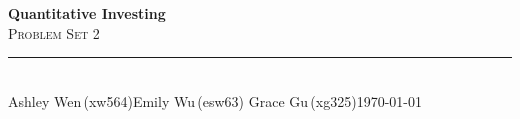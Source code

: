 \documentclass[11pt]{article}
\begin{document}
\thispagestyle{empty}
\begin{flushleft}
{\bfseries\LARGE\color{psink} Quantitative Investing}\\[3pt]
{\scshape\Large\color{psink} Problem Set 2}\\[10pt]
{\color{psrule}\rule{\textwidth}{1.2pt}}\\[5pt]
{\small Ashley Wen\,(xw564)\quad\textbar\quad Emily Wu\,(esw63)%
\quad\textbar\quad Grace Gu\,(xg325)\hfill \today}
\end{flushleft}

\vspace{1.4em}
\end{document}
